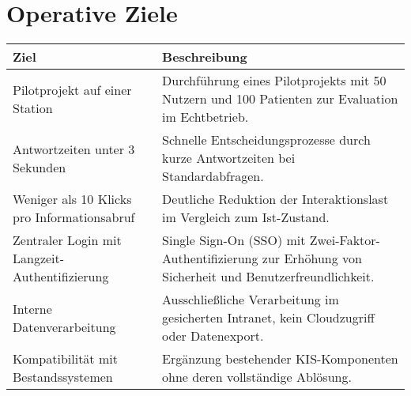 \section{Operative Ziele}
\begin{center}
\begin{tabular}{|p{5cm}|p{10cm}|}
	\hline
	\textbf{Ziel} & \textbf{Beschreibung} \\
	\hline
	Pilotprojekt auf einer Station & Durchführung eines Pilotprojekts mit 50 Nutzern und 100 Patienten zur Evaluation im Echtbetrieb. \\
	\hline
	Antwortzeiten unter 3 Sekunden & Schnelle Entscheidungsprozesse durch kurze Antwortzeiten bei Standardabfragen. \\
	\hline
	Weniger als 10 Klicks pro Informationsabruf & Deutliche Reduktion der Interaktionslast im Vergleich zum Ist-Zustand. \\
	\hline
	Zentraler Login mit Langzeit-Authentifizierung & Single Sign-On (SSO) mit Zwei-Faktor-Authentifizierung zur Erhöhung von Sicherheit und Benutzerfreundlichkeit. \\
	\hline
	Interne Datenverarbeitung & Ausschließliche Verarbeitung im gesicherten Intranet, kein Cloudzugriff oder Datenexport. \\
	\hline
	Kompatibilität mit Bestandssystemen & Ergänzung bestehender KIS-Komponenten ohne deren vollständige Ablösung. \\
	\hline
\end{tabular}
\end{center}


